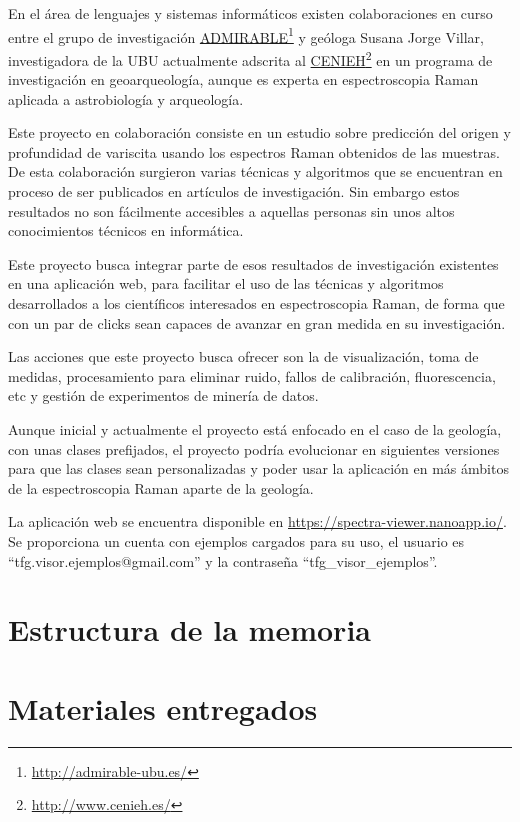 En el área de lenguajes y sistemas informáticos existen colaboraciones en curso
entre el grupo de investigación
\href{http://admirable-ubu.es/}{ADMIRABLE}\footnote{\url{http://admirable-ubu.es/}}
y geóloga Susana Jorge Villar, investigadora de la UBU actualmente adscrita al
\href{http://www.cenieh.es/}{CENIEH}\footnote{\url{http://www.cenieh.es/}} en un
programa de investigación en geoarqueología\cite{susana-cenieh}, aunque es
experta en espectroscopia Raman aplicada a astrobiología y
arqueología\cite{susana-ubu}.

Este proyecto en colaboración consiste en un estudio sobre predicción del origen
y profundidad de variscita usando los espectros Raman obtenidos de las muestras.
De esta colaboración surgieron varias técnicas y algoritmos que se encuentran en
proceso de ser publicados en artículos de investigación. Sin embargo estos
resultados no son fácilmente accesibles a aquellas personas sin unos altos
conocimientos técnicos en informática.

Este proyecto busca integrar parte de esos resultados de investigación
existentes en una aplicación web, para facilitar el uso de las técnicas y
algoritmos desarrollados a los científicos interesados en espectroscopia Raman,
de forma que con un par de clicks sean capaces de avanzar en gran medida en su
investigación.

Las acciones que este proyecto busca ofrecer son la de visualización, toma de
medidas, procesamiento para eliminar ruido, fallos de calibración,
fluorescencia, etc y gestión de experimentos de minería de datos.

Aunque inicial y actualmente el proyecto está enfocado en el caso de la
geología, con unas clases prefijados, el proyecto podría evolucionar en
siguientes versiones para que las clases sean personalizadas y poder usar la
aplicación en más ámbitos de la espectroscopia Raman aparte de la geología.

La aplicación web se encuentra disponible en
\url{https://spectra-viewer.nanoapp.io/}. Se proporciona un cuenta con ejemplos
cargados para su uso, el usuario es ``tfg.visor.ejemplos@gmail.com'' y la
contraseña ``tfg\_visor\_ejemplos''.

\section{Estructura de la memoria}

\section{Materiales entregados}


